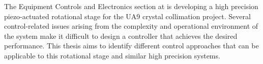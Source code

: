 The Equipment Controls and Electronics section at \abbrCERN is developing a high precision piezo-actuated rotational stage for the UA9 crystal collimation project. Several control-related issues arising from the complexity and operational environment of the system make it difficult to design a controller that achieves the desired performance. This thesis aims to identify different control approaches that can be applicable to this rotational stage and similar high precision systems.

